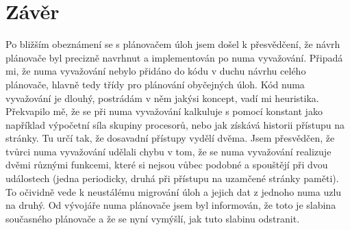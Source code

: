 \documentclass[
  field=ainfk,
  biblatex,
  glossaries,
  index
]{kidiplom}
\begin{document}
\section{Závěr}
Po bližším obeznámení se s plánovačem úloh jsem došel k přesvědčení, že návrh plánovače byl precizně navrhnut a implementován po numa vyvažování. Připadá mi, že numa vyvažování nebylo přidáno do kódu v duchu návrhu celého plánovače, hlavně tedy třídy pro plánování obyčejných úloh. Kód numa vyvažování je dlouhý, postrádám v něm jakýsi koncept, vadí mi heuristika. Překvapilo mě, že se při numa vyvažování kalkuluje s pomocí konstant jako například výpočetní síla skupiny procesorů, nebo jak získává historii přístupu na stránky. Tu určí tak, že dosavadní přístupy vydělí dvěma. Jsem přesvědčen, že tvůrci numa vyvažování udělali chybu v tom, že se numa vyvažování realizuje dvěmi různými funkcemi, které si nejsou vůbec podobné a spouštějí při dvou událostech (jedna periodicky, druhá při přístupu na uzamčené stránky paměti). To očividně vede k neustálému migrování úloh a jejich dat z jednoho numa uzlu na druhý. Od vývojáře numa plánovače jsem byl informován, že toto je slabina současného plánovače a že se nyní vymýšlí, jak tuto slabinu odstranit. 

\nocite{*}

\printbibliography
\printindex


%
%
%
%
\end{document}
